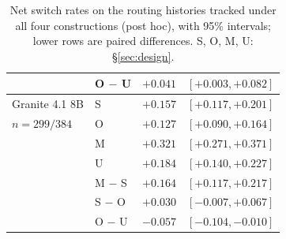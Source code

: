 \begin{table}[t]
\begin{tabular}{@{}llrr@{}}
 & O $-$ U & $+0.041$ & $[+0.003, +0.082]$ \\
\midrule
Granite 4.1 8B & S & $+0.157$ & $[+0.117, +0.201]$ \\
$n=299/384$ & O & $+0.127$ & $[+0.090, +0.164]$ \\
 & M & $+0.321$ & $[+0.271, +0.371]$ \\
 & U & $+0.184$ & $[+0.140, +0.227]$ \\
 & M $-$ S & $+0.164$ & $[+0.117, +0.217]$ \\
 & S $-$ O & $+0.030$ & $[-0.007, +0.067]$ \\
 & O $-$ U & $-0.057$ & $[-0.104, -0.010]$ \\
\bottomrule
\end{tabular}
\caption{Net switch rates on the routing histories tracked under all four constructions (post hoc), with 95\% intervals; lower rows are paired differences. S, O, M, U: \S\ref{sec:design}.}
\label{tab:tracked-models}
\end{table}
